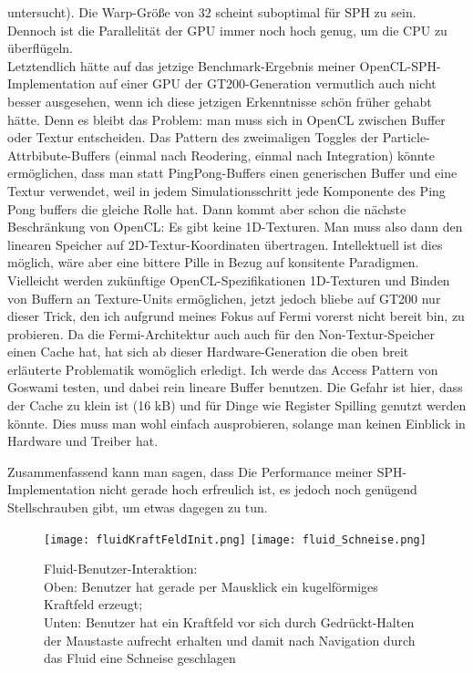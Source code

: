 \begin{enumerate}
		untersucht).
		Die Warp-Größe von 32 scheint suboptimal für SPH zu sein. Dennoch ist die Parallelität der GPU
		immer noch hoch genug, um die CPU zu überflügeln.\\
		Letztendlich hätte auf das jetzige Benchmark-Ergebnis meiner OpenCL-SPH-Implementation
		auf einer GPU der GT200-Generation vermutlich auch nicht besser ausgesehen, wenn ich diese 
		jetzigen Erkenntnisse schön früher gehabt hätte. Denn es bleibt das Problem: man muss sich in
		OpenCL zwischen Buffer oder Textur entscheiden.
		 Das Pattern des zweimaligen Toggles der Particle-Attrbibute-Buffers
		(einmal nach Reodering, einmal nach Integration) könnte ermöglichen, dass man statt PingPong-Buffers
		einen generischen Buffer und eine Textur verwendet, weil in jedem Simulationsschritt jede Komponente
		des Ping Pong buffers die gleiche Rolle hat. Dann kommt aber schon die nächste Beschränkung von
		OpenCL: Es gibt keine 1D-Texturen. Man muss also dann den linearen Speicher auf 2D-Textur-Koordinaten
		übertragen. Intellektuell ist dies möglich, wäre aber eine bittere Pille in Bezug auf konsitente Paradigmen.
		Vielleicht werden zukünftige OpenCL-Spezifikationen 1D-Texturen und Binden von Buffern an Texture-Units
		ermöglichen, jetzt jedoch bliebe auf GT200 nur dieser Trick, den ich aufgrund meines Fokus auf Fermi vorerst 
		nicht bereit bin, zu probieren.
		Da die Fermi-Architektur auch auch für den Non-Textur-Speicher einen Cache hat, hat sich ab dieser
		Hardware-Generation die 
		oben breit erläuterte Problematik womöglich erledigt. Ich werde das Access Pattern von Goswami
		testen, und dabei  rein lineare Buffer benutzen. Die Gefahr ist hier, dass der Cache zu klein ist
		(16 kB) und für Dinge wie Register Spilling genutzt werden könnte. Dies muss man wohl einfach ausprobieren,
		solange man keinen Einblick in Hardware und Treiber hat.
		
	\end{enumerate}	
	
	Zusammenfassend kann man sagen, dass Die Performance meiner SPH-Implementation nicht gerade hoch erfreulich ist, 
	es jedoch noch genügend Stellschrauben gibt, um etwas dagegen zu tun.\\
	
	


\begin{figure}[!h]
	\texttt{[image: fluidKraftFeldInit.png]} 
	\texttt{[image: fluid\_Schneise.png]}
	\caption{ 
		Fluid-Benutzer-Interaktion:\\
		Oben: Benutzer hat gerade per Mausklick ein kugelförmiges Kraftfeld erzeugt;\\
		Unten: Benutzer hat ein Kraftfeld vor sich durch Gedrückt-Halten der Maustaste aufrecht erhalten
		und damit nach Navigation durch das Fluid eine Schneise geschlagen
	}
	\label{fig:fluidSimForcePix}
\end{figure}


\clearpage
